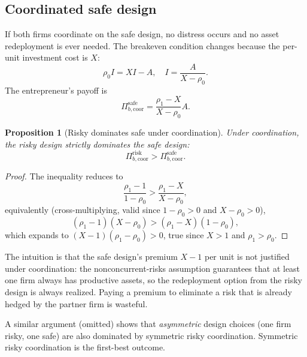 \documentclass[11pt,a4paper,oneside]{book}
\theoremstyle{plain}
\newtheorem{proposition}[theorem]{Proposition}
\theoremstyle{definition}
\theoremstyle{remark}
\numberwithin{equation}{chapter}
\begin{document}
\subsection{Coordinated safe design}

If both firms coordinate on the safe design, no distress occurs and no asset redeployment is ever needed.
The breakeven condition changes because the per-unit investment cost is $X$:
\begin{equation*}
  \rho_0 I = X I - A,
  \quad I = \frac{A}{X - \rho_0}.
\end{equation*}
The entrepreneur's payoff is
\begin{equation}\label{eq:ma-coord-safe}
  \Pi_{b, \text{coor}}^{\text{safe}} = \frac{\rho_1 - X}{X - \rho_0} A.
\end{equation}

\begin{proposition}[Risky dominates safe under coordination]\label{prop:ma-coord-comparison}
Under coordination, the risky design strictly dominates the safe design:
\begin{equation*}
  \Pi_{b, \text{coor}}^{\text{risk}} > \Pi_{b, \text{coor}}^{\text{safe}}.
\end{equation*}
\end{proposition}

\begin{proof}
The inequality reduces to
\begin{equation*}
  \frac{\rho_1 - 1}{1 - \rho_0} > \frac{\rho_1 - X}{X - \rho_0},
\end{equation*}
equivalently (cross-multiplying, valid since $1 - \rho_0 > 0$ and $X - \rho_0 > 0$),
\begin{equation*}
  (\rho_1 - 1)(X - \rho_0) > (\rho_1 - X)(1 - \rho_0),
\end{equation*}
which expands to $(X - 1)(\rho_1 - \rho_0) > 0$, true since $X > 1$ and $\rho_1 > \rho_0$.
\end{proof}

The intuition is that the safe design's premium $X - 1$ per unit is not justified under coordination: the nonconcurrent-risks assumption guarantees that at least one firm always has productive assets, so the redeployment option from the risky design is always realized.
Paying a premium to eliminate a risk that is already hedged by the partner firm is wasteful.

A similar argument (omitted) shows that \emph{asymmetric} design choices (one firm risky, one safe) are also dominated by symmetric risky coordination.
Symmetric risky coordination is the first-best outcome.
\end{document}
